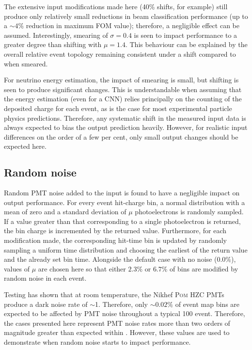 The extensive input modifications made here (40\% shifts, for example) still produce only
relatively small reductions in beam classification performance (up to a $\sim4\%$ reduction in
maximum FOM value); therefore, a negligible effect can be assumed. Interestingly, smearing of
$\sigma=0.4$ is seen to impact performance to a greater degree than shifting with $\mu=1.4$. This
behaviour can be explained by the overall relative event topology remaining consistent under a
shift compared to when smeared.

For neutrino energy estimation, the impact of smearing is small, but shifting is seen to produce
significant changes. This is understandable when assuming that the energy estimation (even for a
CNN) relies principally on the counting of the deposited charge for each event, as is the case for
most experimental particle physics predictions. Therefore, any systematic shift in the measured
input data is always expected to bias the output prediction heavily. However, for realistic input
differences on the order of a few per cent, only small output changes should be expected here.

\subsection{Random noise} %
\label{sec:results_robust_noise} %

Random PMT noise added to the input is found to have a negligible impact on output performance.
For every event hit-charge bin, a normal distribution with a mean of zero and a standard deviation
of $\mu$ photoelectrons is randomly sampled. If a value greater than that corresponding to a
single photoelectron is returned, the bin charge is incremented by the returned value.
Furthermore, for each modification made, the corresponding hit-time bin is updated by randomly
sampling a uniform time distribution and choosing the earliest of the return value and the already
set bin time. Alongside the default case with no noise ($0.0\%$), values of $\mu$ are chosen here
so that either $2.3\%$ or $6.7\%$ of bins are modified by random noise in each event.

Testing has shown that at room temperature, the Nikhef \textsc{Pom} HZC PMTs produce a dark noise
rate of $\sim$\SI{1}{}. Therefore, only $\sim0.02\%$ of event map bins are expected to
be affected by PMT noise throughout a typical \SI{100}{} event. Therefore, the cases
presented here represent PMT noise rates more than two orders of magnitude greater than expected
within \chipsfive. However, these values are used to demonstrate when random noise starts to
impact performance.

